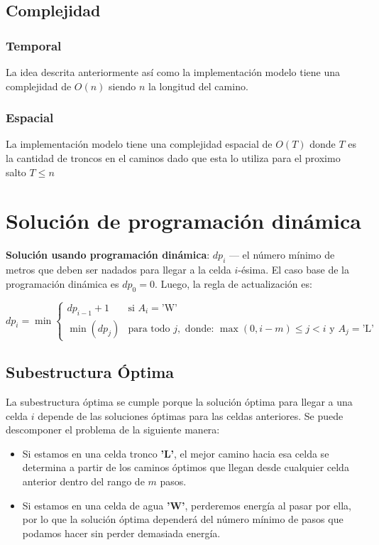 \documentclass{article}
\begin{document}
\subsection{Complejidad}
\subsubsection{Temporal}
La idea descrita anteriormente así como la implementación modelo tiene una 
complejidad de $O(n)$ siendo $n$ la longitud del camino.
\subsubsection{Espacial}
La implementación modelo tiene una complejidad espacial de 
$O(T)$ donde $T$ es la cantidad de troncos en el caminos
dado que esta lo utiliza para el proximo salto
$T \leq n$


\section*{Solución de programación dinámica}
\textbf{Solución usando programación dinámica}: $dp_i$ — el número mínimo de metros que deben ser nadados para llegar a la celda $i$-ésima. El caso base de la programación dinámica es $dp_0 = 0$. Luego, la regla de actualización es:

\[
dp_i = \min \left\{ 
  \begin{array}{ll}
    dp_{i-1} + 1 & \text{si } A_i = \text{'W'} \\
    \min(dp_j) & \text{para todo } j, \text{ donde: } \max(0, i-m) \leq j < i \text{ y } A_j = \text{'L'}
  \end{array}
\right.
\]





\subsection*{Subestructura Óptima}

La subestructura óptima se cumple porque la solución óptima para llegar a una celda \( i \) depende de las soluciones óptimas para las celdas anteriores. Se puede descomponer el problema de la siguiente manera:
\begin{itemize}
    \item Si estamos en una celda tronco \textbf{'L'}, el mejor camino hacia esa celda se determina a partir de los caminos óptimos que llegan desde cualquier celda anterior dentro del rango de \( m \) pasos.
    \item Si estamos en una celda de agua \textbf{'W'}, perderemos energía al pasar por ella, por lo que la solución óptima dependerá del número mínimo de pasos que podamos hacer sin perder demasiada energía.
\end{itemize}
\end{document}
